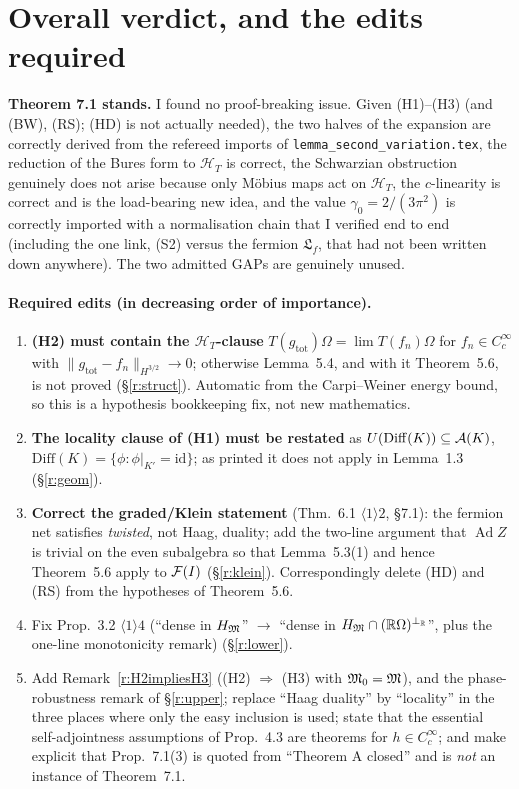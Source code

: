 \documentclass[11pt]{article}
\newcommand{\HT}{\mathcal H_T}
\newcommand{\norm}[1]{\lVert#1\rVert}
\newcommand{\Ad}{\operatorname{Ad}}
\newcommand{\HM}{H_{\cM}}
\newcommand{\Om}{\Omega}
\newcommand{\gtot}{g_{\mathrm{tot}}}
\begin{document}
\section{Overall verdict, and the edits required}\label{r:edits}

\begin{verdictok}
\textbf{Theorem 7.1 stands.}  I found no proof-breaking issue.  Given (H1)--(H3) (and (BW), (RS); (HD) is
not actually needed), the two halves of the expansion are correctly derived from the refereed imports of
\texttt{lemma\_second\_variation.tex}, the reduction of the Bures form to $\HT$ is correct, the Schwarzian
obstruction genuinely does not arise because only M\"obius maps act on $\HT$, the $c$-linearity is correct
and is the load-bearing new idea, and the value $\gamma_0=2/(3\pi^2)$ is correctly imported with a
normalisation chain that I verified end to end (including the one link, (S2) versus the fermion
$\mathfrak L_f$, that had not been written down anywhere).  The two admitted GAPs are genuinely unused.
\end{verdictok}

\paragraph{Required edits (in decreasing order of importance).}
\begin{enumerate}[leftmargin=1.9em]
\item \textbf{(H2) must contain the $\HT$-clause} $T(\gtot)\Om=\lim T(f_n)\Om$ for $f_n\in C^\infty_c$
 with $\norm{\gtot-f_n}_{H^{3/2}}\to0$; otherwise Lemma~5.4, and with it Theorem~5.6, is not proved
 (\S\ref{r:struct}).  Automatic from the Carpi--Weiner energy bound, so this is a hypothesis bookkeeping
 fix, not new mathematics.
\item \textbf{The locality clause of (H1) must be restated} as $U(\mathrm{Diff}(K))\subseteq\mathcal A(K)$,
 $\mathrm{Diff}(K)=\{\phi:\phi|_{K'}=\mathrm{id}\}$; as printed it does not apply in Lemma~1.3
 (\S\ref{r:geom}).
\item \textbf{Correct the graded/Klein statement} (Thm.\ 6.1 $\langle1\rangle2$, \S7.1): the fermion net
 satisfies \emph{twisted}, not Haag, duality; add the two-line argument that $\Ad Z$ is trivial on the even
 subalgebra so that Lemma~5.3(1) and hence Theorem~5.6 apply to $\mathcal F(I)$ (\S\ref{r:klein}).
 Correspondingly delete (HD) and (RS) from the hypotheses of Theorem~5.6.
\item Fix Prop.\ 3.2 $\langle1\rangle4$ (``dense in $\HM$'' $\to$ ``dense in
 $\HM\cap(\mathbb R\Om)^{\perp_{\mathbb R}}$'', plus the one-line monotonicity remark) (\S\ref{r:lower}).
\item Add Remark~\ref{r:H2impliesH3} ((H2) $\Rightarrow$ (H3) with $\mathfrak M_0=\mathfrak M$), and the phase-robustness
 remark of \S\ref{r:upper}; replace ``Haag duality'' by ``locality'' in the three places where only the easy
 inclusion is used; state that the essential self-adjointness assumptions of Prop.~4.3 are theorems for
 $h\in C^\infty_c$; and make explicit that Prop.~7.1(3) is quoted from ``Theorem A closed'' and is
 \emph{not} an instance of Theorem~7.1.
\end{enumerate}
\end{document}
